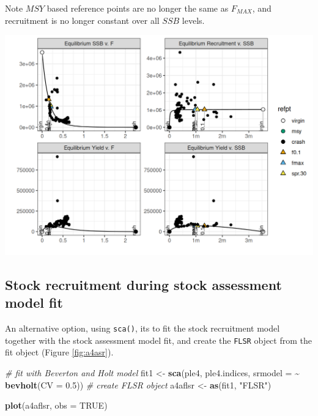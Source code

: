 \documentclass[
]{book}
\newenvironment{Shaded}{\begin{snugshade}}{\end{snugshade}}
\newcommand{\AttributeTok}[1]{\textcolor[rgb]{0.13,0.29,0.53}{#1}}
\newcommand{\CommentTok}[1]{\textcolor[rgb]{0.56,0.35,0.01}{\textit{#1}}}
\newcommand{\ConstantTok}[1]{\textcolor[rgb]{0.56,0.35,0.01}{#1}}
\newcommand{\FloatTok}[1]{\textcolor[rgb]{0.00,0.00,0.81}{#1}}
\newcommand{\FunctionTok}[1]{\textcolor[rgb]{0.13,0.29,0.53}{\textbf{#1}}}
\newcommand{\NormalTok}[1]{#1}
\newcommand{\OtherTok}[1]{\textcolor[rgb]{0.56,0.35,0.01}{#1}}
\newcommand{\SpecialCharTok}[1]{\textcolor[rgb]{0.81,0.36,0.00}{\textbf{#1}}}
\newcommand{\StringTok}[1]{\textcolor[rgb]{0.31,0.60,0.02}{#1}}
\begin{document}
Note \(MSY\) based reference points are no longer the same as \(F_{MAX}\), and recruitment is no longer constant over all \(SSB\) levels.

\includegraphics{_bookdown_files/_main_files/figure-html/unnamed-chunk-106-1.png}

\hypertarget{stock-recruitment-during-stock-assessment-model-fit}{%
\subsection{Stock recruitment during stock assessment model fit}\label{stock-recruitment-during-stock-assessment-model-fit}}

An alternative option, using \texttt{sca()}, its to fit the stock recruitment model together with the stock assessment model fit, and create the \texttt{FLSR} object from the fit object (Figure \ref{fig:a4asr}).

\begin{Shaded}
\begin{Highlighting}[]
\CommentTok{\# fit with Beverton and Holt model}
\NormalTok{fit1 }\OtherTok{\textless{}{-}} \FunctionTok{sca}\NormalTok{(ple4, ple4.indices, }\AttributeTok{srmodel =} \SpecialCharTok{\textasciitilde{}} \FunctionTok{bevholt}\NormalTok{(}\AttributeTok{CV =} \FloatTok{0.5}\NormalTok{))}
\CommentTok{\# create FLSR object}
\NormalTok{a4aflsr }\OtherTok{\textless{}{-}} \FunctionTok{as}\NormalTok{(fit1, }\StringTok{"FLSR"}\NormalTok{)}
\end{Highlighting}
\end{Shaded}

\begin{Shaded}
\begin{Highlighting}[]
\FunctionTok{plot}\NormalTok{(a4aflsr, }\AttributeTok{obs =} \ConstantTok{TRUE}\NormalTok{)}
\end{Highlighting}
\end{Shaded}
\end{document}
